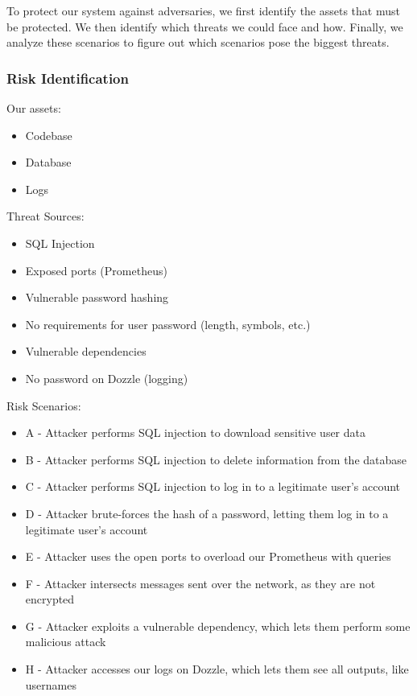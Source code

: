 To protect our system against adversaries, we first identify the assets that must be protected. We then identify which threats we could face and how. Finally, we analyze these scenarios to figure out which scenarios pose the biggest threats.

\subsubsection{Risk Identification}
Our assets:
\begin{itemize}
    \item Codebase
    \item Database
    \item Logs
\end{itemize}

Threat Sources:
\begin{itemize}
    \item SQL Injection
    \item Exposed ports (Prometheus)
    \item Vulnerable password hashing
    \item No requirements for user password (length, symbols, etc.)
    \item Vulnerable dependencies
    \item No password on Dozzle (logging)
\end{itemize}

Risk Scenarios:
\begin{itemize}
    \item A - Attacker performs SQL injection to download sensitive user data
    \item B - Attacker performs SQL injection to delete information from the database
    \item C - Attacker performs SQL injection to log in to a legitimate user's account
    \item D - Attacker brute-forces the hash of a password, letting them log in to a legitimate user's account
    \item E - Attacker uses the open ports to overload our Prometheus with queries
    \item F - Attacker intersects messages sent over the network, as they are not encrypted
    \item G - Attacker exploits a vulnerable dependency, which lets them perform some malicious attack
    \item H - Attacker accesses our logs on Dozzle, which lets them see all outputs, like usernames
\end{itemize}

